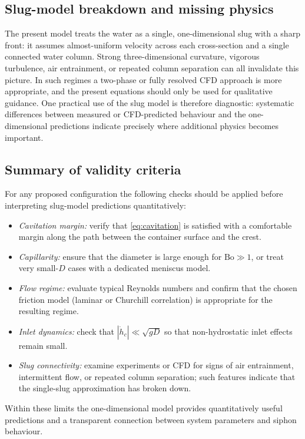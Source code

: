 \documentclass[11pt]{article}
\begin{document}
\subsection{Slug-model breakdown and missing physics}

The present model treats the water as a single, one-dimensional slug with a sharp front: it
assumes almost-uniform velocity across each cross-section and a single connected water column.
Strong three-dimensional curvature, vigorous turbulence, air entrainment, or repeated column
separation can all invalidate this picture. In such regimes a two-phase or fully resolved CFD
approach is more appropriate, and the present equations should only be used for qualitative
guidance. One practical use of the slug model is therefore diagnostic: systematic differences
between measured or CFD-predicted behaviour and the one-dimensional predictions indicate
precisely where additional physics becomes important.

\subsection{Summary of validity criteria}

For any proposed configuration the following checks should be applied before interpreting
slug-model predictions quantitatively:
\begin{itemize}
  \item \emph{Cavitation margin:} verify that \cref{eq:cavitation} is satisfied with a comfortable
        margin along the path between the container surface and the crest.
  \item \emph{Capillarity:} ensure that the diameter is large enough for $\mathrm{Bo}\gg 1$, or
        treat very small-$D$ cases with a dedicated meniscus model.
  \item \emph{Flow regime:} evaluate typical Reynolds numbers and confirm that the chosen friction
        model (laminar or Churchill correlation) is appropriate for the resulting regime.
  \item \emph{Inlet dynamics:} check that $|\dot h_c|\ll \sqrt{gD}$ so that non-hydrostatic inlet
        effects remain small.
  \item \emph{Slug connectivity:} examine experiments or CFD for signs of air entrainment,
        intermittent flow, or repeated column separation; such features indicate that the
        single-slug approximation has broken down.
\end{itemize}
Within these limits the one-dimensional model provides quantitatively useful predictions and a
transparent connection between system parameters and siphon behaviour.
\end{document}
